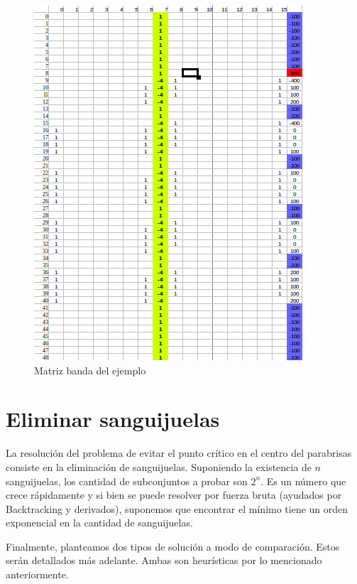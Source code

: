 \begin{figure}
\begin{center}
\includegraphics[scale=0.70]{imagenes/matrizbandaej.png} 
\caption{Matriz banda del ejemplo} 
\end{center}
\end{figure}




\section{Eliminar sanguijuelas}

La resolución del problema de evitar el punto crítico en el centro del parabrisas consiste en la eliminación de sanguijuelas. Suponiendo la existencia de $n$ sanguijuelas, los cantidad de subconjuntos a probar son $2^n$. Es un número que crece rápidamente y si bien se puede resolver por fuerza bruta (ayudados por Backtracking y derivados), suponemos que encontrar el mínimo tiene un orden exponencial en la cantidad de sanguijuelas.

Finalmente, planteamos dos tipos de solución a modo de comparación. Estos serán detallados más adelante. Ambas son heurísticas por lo mencionado anteriormente.

